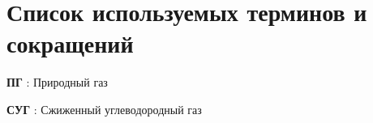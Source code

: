 \chapter*{Список используемых терминов и сокращений}             %

\textbf{ПГ} : Природный газ

\textbf{СУГ} : Сжиженный углеводородный газ
